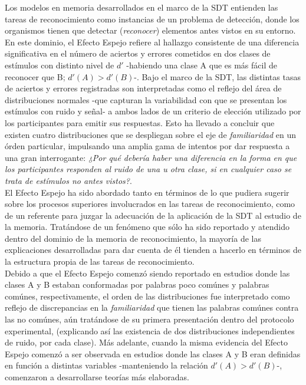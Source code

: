 Los modelos en memoria desarrollados en el marco de la SDT entienden las tareas de reconocimiento como instancias de un problema de detección, donde los organismos tienen que detectar (\textit{reconocer}) elementos antes vistos en su entorno. En este dominio, el Efecto Espejo refiere al hallazgo consistente de una diferencia significativa en el número de aciertos y errores cometidos en dos clases de estímulos con distinto nivel de $d'$ -habiendo una clase A que es más fácil de reconocer que B; $d'(A)>d'(B)$-. Bajo el marco de la SDT, las distintas tasas de aciertos y errores registradas son interpretadas como el reflejo del área de distribuciones normales -que capturan la variabilidad con que se presentan los estímulos con ruido y señal- a ambos lados de un criterio de elección utilizado por los participantes para emitir sus respuestas. Esto ha llevado a concluir que existen cuatro distribuciones que se despliegan sobre el eje de \textit{familiaridad} en un órden particular, impulsando una amplia gama de intentos por dar respuesta a una gran interrogante: \textit{¿Por qué debería haber una diferencia en la forma en que los participantes responden al ruido de una u otra clase, si en cualquier caso se trata de estímulos no antes vistos?}.\\

El Efecto Espejo ha sido abordado tanto en términos de lo que pudiera sugerir sobre los procesos superiores involucrados en las tareas de reconocimiento, como de un referente para juzgar la adecuación de la aplicación de la SDT al estudio de la memoria. Tratándose de un fenómeno que sólo ha sido reportado y atendido dentro del dominio de la memoria de reconocimiento, la mayoría de las explicaciones desarrolladas para dar cuenta de él tienden a hacerlo en términos de la estructura propia de las tareas de reconocimiento.\\

Debido a que el Efecto Espejo comenzó siendo reportado en estudios donde las clases A y B estaban conformadas por palabras poco comúnes y palabras comúnes, respectivamente, el orden de las distribuciones fue interpretado como reflejo de discrepancias en la \textit{familiaridad} que tienen las palabras comúnes contra las no comúnes, aún tratándose de su primera presentación dentro del protocolo experimental, (explicando así las existencia de dos distribuciones independientes de ruido, por cada clase). Más adelante, cuando la misma evidencia del Efecto Espejo comenzó a ser observada en estudios donde las clases A y B eran definidas en función a distintas variables -manteniendo la relación $d'(A)>d'(B)$-, comenzaron a desarrollarse teorías más elaboradas.\\

